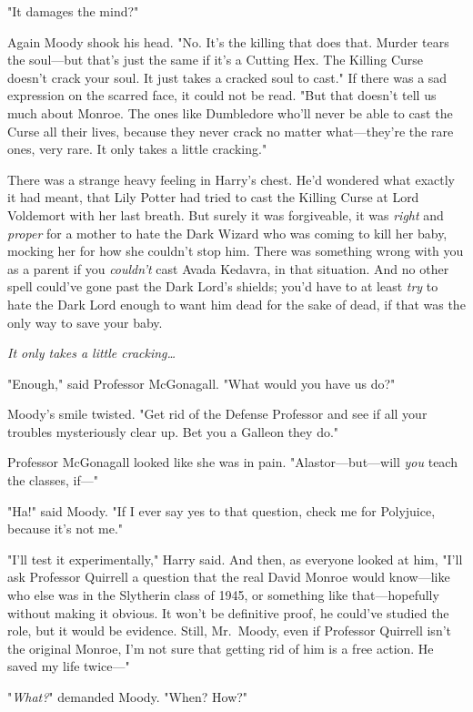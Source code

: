 "It damages the mind?"

Again Moody shook his head. "No. It's the killing that does that. Murder tears
the soul---but that's just the same if it's a Cutting Hex. The Killing Curse
doesn't crack your soul. It just takes a cracked soul to cast." If there was a
sad expression on the scarred face, it could not be read. "But that doesn't
tell us much about Monroe. The ones like Dumbledore who'll never be able to
cast the Curse all their lives, because they never crack no matter
what---they're the rare ones, very rare. It only takes a little cracking."

There was a strange heavy feeling in Harry's chest. He'd wondered what exactly
it had meant, that Lily Potter had tried to cast the Killing Curse at Lord
Voldemort with her last breath. But surely it was forgiveable, it was
\emph{right} and \emph{proper} for a mother to hate the Dark Wizard who was
coming to kill her baby, mocking her for how she couldn't stop him. There was
something wrong with you as a parent if you \emph{couldn't} cast Avada Kedavra,
in that situation. And no other spell could've gone past the Dark Lord's
shields; you'd have to at least \emph{try} to hate the Dark Lord enough to want
him dead for the sake of dead, if that was the only way to save your baby.

\emph{It only takes a little cracking{\ldots}}

"Enough," said Professor McGonagall. "What would you have us do?"

Moody's smile twisted. "Get rid of the Defense Professor and see if all your
troubles mysteriously clear up. Bet you a Galleon they do."

Professor McGonagall looked like she was in pain. "Alastor---but---will
\emph{you} teach the classes, if---"

"Ha!" said Moody. "If I ever say yes to that question, check me for Polyjuice,
because it's not me."

"I'll test it experimentally," Harry said. And then, as everyone looked at him,
"I'll ask Professor Quirrell a question that the real David Monroe would
know---like who else was in the Slytherin class of 1945, or something like
that---hopefully without making it obvious. It won't be definitive proof, he
could've studied the role, but it would be evidence. Still, Mr.~Moody, even if
Professor Quirrell isn't the original Monroe, I'm not sure that getting rid of
him is a free action. He saved my life twice---"

"\emph{What?}" demanded Moody. "When? How?"

